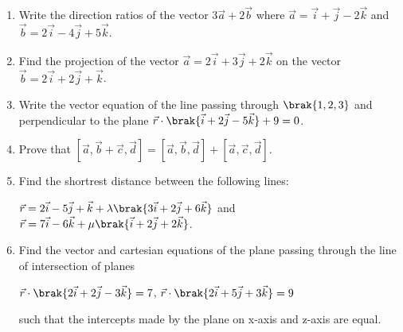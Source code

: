 \begin{enumerate}
\item Write the direction ratios of the vector $3\vec{a}+2\vec{b}$ where $\vec{a} = \vec{i}+\vec{j}-2\vec{k}$ and $\vec{b} = 2\vec{i}-4\vec{j}+5\vec{k}$. 

\item Find the projection of the vector $\vec{a}=2\vec{i}+3\vec{j}+2\vec{k}$ on the vector $\vec{b}=2\vec{i}+2\vec{j}+\vec{k}$. 

\item Write the vector equation of the line passing through $\brak{1,2,3}$ and perpendicular to the plane $\vec{r}\cdot\brak{\vec{i}+2\vec{j}-5\vec{k}}+9=0$. 

\item Prove that $[\vec{a},\vec{b}+\vec{c},\vec{d}] = [\vec{a},\vec{b},\vec{d}]+[\vec{a},\vec{c},\vec{d}]$.  

\item Find the shortrest distance between the following lines:

$\vec{r} = 2\vec{i}-5\vec{j}+\vec{k} +\lambda\brak{3\vec{i}+2\vec{j}+6\vec{k}}$ and $\vec{r} = 7\vec{i}-6\vec{k}+\mu\brak{\vec{i}+2\vec{j}+2\vec{k}}$. 

\item Find the vector and cartesian equations of the plane passing through the line of intersection of planes 

$\vec{r}\cdot\brak{2\vec{i}+2\vec{j}-3\vec{k}}=7$, \quad $\vec{r}\cdot\brak{2\vec{i}+5\vec{j}+3\vec{k}}=9$

such that the intercepts made by the plane on x-axis and z-axis are equal.
\end{enumerate}
